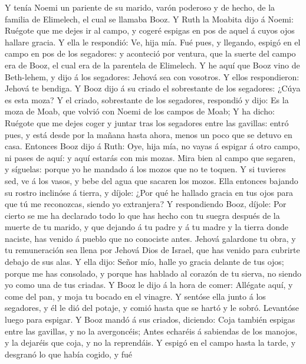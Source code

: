  Y tenía Noemi un pariente de su marido, varón poderoso y de
hecho, de la familia de Elimelech, el cual se llamaba Booz. 
Y Ruth la Moabita dijo á Noemi: Ruégote que me dejes ir al campo, y
cogeré espigas en pos de aquel á cuyos ojos hallare gracia. Y ella le
respondió: Ve, hija mía.  Fué pues, y llegando, espigó en el
campo en pos de los segadores: y aconteció por ventura, que la suerte
del campo era de Booz, el cual era de la parentela de Elimelech.
 Y he aquí que Booz vino de Beth-lehem, y dijo á los
segadores: Jehová sea con vosotros. Y ellos respondieron: Jehová te
bendiga.  Y Booz dijo á su criado el sobrestante de los
segadores: ¿Cúya es esta moza?  Y el criado, sobrestante de
los segadores, respondió y dijo: Es la moza de Moab, que volvió con
Noemi de los campos de Moab;  Y ha dicho: Ruégote que me
dejes coger y juntar tras los segadores entre las gavillas: entró pues,
y está desde por la mañana hasta ahora, menos un poco que se detuvo en
casa.  Entonces Booz dijo á Ruth: Oye, hija mía, no vayas á
espigar á otro campo, ni pases de aquí: y aquí estarás con mis mozas.
 Mira bien al campo que segaren, y síguelas: porque yo he
mandado á los mozos que no te toquen. Y si tuvieres sed, ve á los vasos,
y bebe del agua que sacaren los mozos.  Ella entonces
bajando su rostro inclinóse á tierra, y díjole: ¿Por qué he hallado
gracia en tus ojos para que tú me reconozcas, siendo yo extranjera?
 Y respondiendo Booz, díjole: Por cierto se me ha declarado
todo lo que has hecho con tu suegra después de la muerte de tu marido, y
que dejando á tu padre y á tu madre y la tierra donde naciste, has
venido á pueblo que no conociste antes.  Jehová galardone
tu obra, y tu remuneración sea llena por Jehová Dios de Israel, que has
venido para cubrirte debajo de sus alas.  Y ella dijo:
Señor mío, halle yo gracia delante de tus ojos; porque me has consolado,
y porque has hablado al corazón de tu sierva, no siendo yo como una de
tus criadas.  Y Booz le dijo á la hora de comer: Allégate
aquí, y come del pan, y moja tu bocado en el vinagre. Y sentóse ella
junto á los segadores, y él le dió del potaje, y comió hasta que se
hartó y le sobró.  Levantóse luego para espigar. Y Booz
mandó á sus criados, diciendo: Coja también espigas entre las gavillas,
y no la avergoncéis;  Antes echaréis á sabiendas de los
manojos, y la dejaréis que coja, y no la reprendáis.  Y
espigó en el campo hasta la tarde, y desgranó lo que había cogido, y fué
